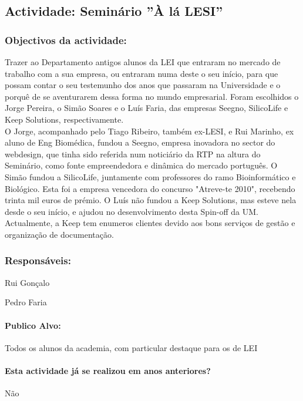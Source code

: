 \subsection{Actividade: Seminário ''À lá LESI''} %

\subsubsection*{Objectivos da actividade:}
Trazer ao Departamento antigos alunos da LEI que entraram no mercado de trabalho com a sua empresa, ou entraram numa deste o seu início, para que possam contar o seu testemunho dos anos que passaram na Universidade e o porquê de se aventurarem dessa forma no mundo empresarial. Foram escolhidos o Jorge Pereira, o Simão Soares e o Luís Faria, das empresas Seegno, SilicoLife e Keep Solutions, respectivamente.\\
O Jorge, acompanhado pelo Tiago Ribeiro, também ex-LESI, e Rui Marinho, ex aluno de Eng Biomédica, fundou a Seegno, empresa inovadora no sector do webdesign, que tinha sido referida num noticiário da RTP na altura do Seminário, como fonte empreendedora e dinâmica do mercado português. O Simão fundou a SilicoLife, juntamente com professores do ramo Bioinformático e Biológico. Esta foi a empresa vencedora do concurso "Atreve-te 2010", recebendo trinta mil euros de prémio. O Luís não fundou a Keep Solutions, mas esteve nela desde o seu início, e ajudou no desenvolvimento desta Spin-off da UM. Actualmente, a Keep tem enumeros clientes devido aos bons serviços de gestão e organização de documentação.

\subsubsection*{Responsáveis:}
\begin{itemizedash}
	\item{Rui Gonçalo}
	\item{Pedro Faria}
\end{itemizedash}

\paragraph{Publico Alvo: }
Todos os alunos da academia, com particular destaque para os de LEI

\paragraph{Esta actividade já se realizou em anos anteriores?}
Não


